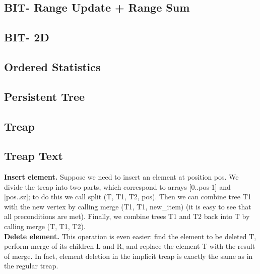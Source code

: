 \documentclass[12pt]{extarticle}
\begin{document}
\begin{multicols*}{2}
% 

\subsection{BIT- Range Update + Range Sum} %


\subsection{BIT- 2D} %


\subsection{Ordered Statistics} %


\subsection{Persistent Tree} %


\subsection{Treap} %


\subsection{Treap Text} 
\textbf{Insert element.}
Suppose we need to insert an element at position pos. We divide the treap into two parts, which correspond to arrays [0..pos-1] and [pos..sz]; to do this we call split (T, T1, T2, pos). Then we can combine tree T1 with the new vertex by calling merge (T1, T1, new\_item) (it is easy to see that all preconditions are met). Finally, we combine trees T1 and T2 back into T by calling merge (T, T1, T2).\\
\textbf{Delete element.}
This operation is even easier: find the element to be deleted T, perform merge of its children L and R, and replace the element T with the result of merge. In fact, element deletion in the implicit treap is exactly the same as in the regular treap.



\end{multicols*}
\end{document}
